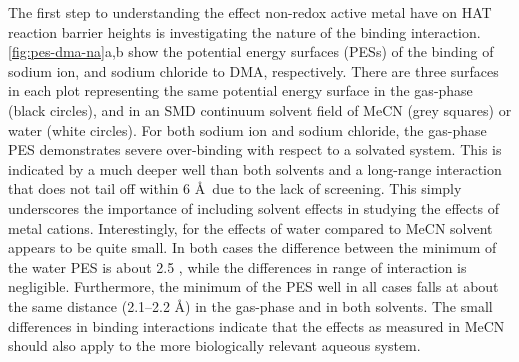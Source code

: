 The first step to understanding the effect non-redox active metal have on HAT
reaction barrier heights is investigating the nature of the binding interaction.
\ref{fig:pes-dma-na}a,b show the potential energy surfaces (PESs) of the binding
of sodium ion, and sodium chloride to DMA, respectively. There are three
surfaces in each plot representing the same potential energy surface in the
gas-phase (black circles), and in an SMD\cite{Marenich2009} continuum solvent
field of MeCN (grey squares) or water (white circles). For both sodium ion and
sodium chloride, the gas-phase PES demonstrates severe over-binding with respect
to a solvated system. This is indicated by a much deeper well than both solvents
and a long-range interaction that does not tail off within 6 \AA\ due to the
lack of screening. This simply underscores the importance of including solvent
effects in studying the effects of metal cations. Interestingly, for the effects
of water compared to MeCN solvent appears to be quite small. In both cases the
difference between the minimum of the water PES is about 2.5 \kcalmol, while the
differences in range of interaction is negligible. Furthermore, the minimum of
the PES well in all cases falls at about the same distance (2.1--2.2 \AA) in the
gas-phase and in both solvents. The small differences in binding interactions
indicate that the effects as measured in MeCN should also apply to the more
biologically relevant aqueous system.

